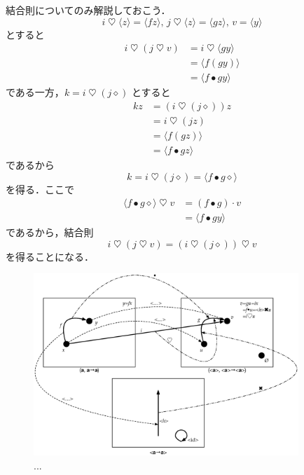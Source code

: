 \documentclass[a5paper,twoside,fleqn,draft]{jsbook}
\newcommand{\mAnonParam}{\diamond}
\DeclareMathOperator{\mBind}{\heartsuit}
\DeclareMathOperator{\mComp}{\bullet} %
\DeclareMathOperator{\mMap}{\cdot} %
\newcommand{\mPureWith}[1]{\langle#1\rangle}
\begin{document}
結合則についてのみ解説しておこう．
\begin{equation}
i\mBind\mPureWith{z}=\mPureWith{fz},\,
j\mBind\mPureWith{z}=\mPureWith{gz},\,
v=\mPureWith{y}
\end{equation}
とすると
\begin{align}
i\mBind(j\mBind v)&=i\mBind\mPureWith{gy}\\
&=\mPureWith{f(gy)}\\
&=\mPureWith{f\mComp gy}
\end{align}
である一方，$k=i\mBind{}(j\mAnonParam)$ とすると
\begin{align}
kz&=(i\mBind(j\mAnonParam))z\\
&=i\mBind(jz)\\
&=\mPureWith{f(gz)}\\
&=\mPureWith{f\mComp gz}
\end{align}
であるから
\begin{equation}
k=i\mBind{}(j\mAnonParam)=\mPureWith{f\mComp g\mAnonParam}
\end{equation}
を得る．ここで
\begin{align}
\mPureWith{f\mComp g\mAnonParam}\mBind v
&=(f\mComp g)\mMap v\\
&=\mPureWith{f\mComp gy}
\end{align}
であるから，結合則
\begin{equation}
i\mBind{}(j\mBind v)=(i\mBind{}(j\mAnonParam))\mBind v
\end{equation}
を得ることになる．

\begin{figure}
\begin{center}
\includegraphics[width=100mm]{fig/functor.eps}
\end{center}
\caption{...}
\label{fig:functor}
\end{figure}

\end{document}
